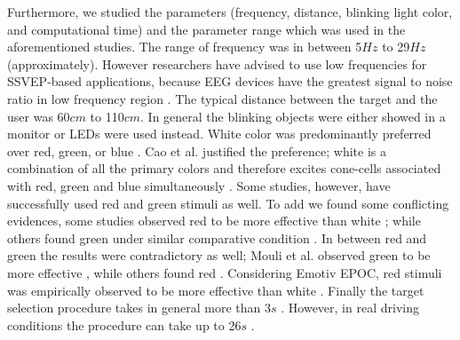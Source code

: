 \documentclass[smallextended]{svjour3}
\begin{document}
Furthermore, we studied the parameters (frequency, distance, blinking light color, and computational time) and the parameter range which was used in the aforementioned studies. The range of frequency was in between 5$Hz$ to 29$Hz$ (approximately). However researchers have advised to use low frequencies for SSVEP-based applications, because EEG devices have the greatest signal to noise ratio in low frequency region \cite{paper6}. The typical distance between the target and the user was 60$cm$ to 110$cm$. In general the blinking objects were either showed in a monitor or LEDs were used instead. White color was predominantly preferred over red, green, or blue \cite{paper6,aljshamee2014beyond,aljshamee2016discriminate,cao2012flashing,paper2}. Cao et al. justified the preference; white is a combination of all the primary colors and therefore excites cone-cells associated with red, green and blue simultaneously \cite{cao2012flashing}. Some studies, however, have successfully used red \cite{paper_5,jian2014improving,paper4} and green \cite{chua2004effects,duvinage2013performance,SSVEPfiability,hvaring2014comparison,paper4,mouli2013performance} stimuli as well. To add we found some conflicting evidences, some studies observed red to be more effective than white \cite{paper_5,hvaring2014comparison}; while others found green under similar comparative condition \cite{chua2004effects,duvinage2013performance}. In between red and green the results were contradictory as well; Mouli et al. observed green to be more effective \cite{mouli2013performance}, while others found red \cite{cao2012flashing}. Considering Emotiv EPOC, red stimuli was empirically observed to be more effective than white \cite{hvaring2014comparison}. Finally the target selection procedure takes in general more than 3$s$ \cite{car,SSVEPfiability,jian2014improving,paper4}. However, in real driving conditions the procedure can take up to 26$s$ \cite{car}.
\end{document}
